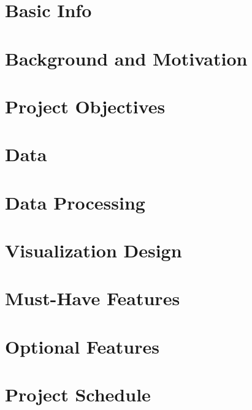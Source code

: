 \documentclass{article}
\begin{document}
\section{Basic Info}
\section{Background and Motivation}
\section{Project Objectives}
\section{Data}
\section{Data Processing}
\section{Visualization Design}
\section{Must-Have Features}
\section{Optional Features}
\section{Project Schedule}
\end{document}
